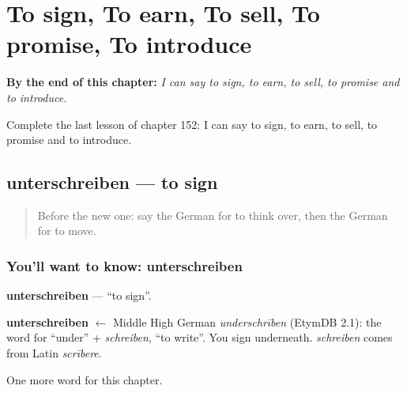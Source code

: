 
\chapter{To sign, To earn, To sell, To promise, To introduce}
\label{ch:ge-to-sign-to-earn-to-sell-to-promise-to-introduce}

\begin{chapteropening}
\textbf{By the end of this chapter:} \emph{I can say to sign, to earn, to sell, to promise and to introduce.}

Complete the last lesson of chapter 152: I can say to sign, to earn, to sell, to promise and to introduce.
\end{chapteropening}

\section[unterschreiben]{unterschreiben — to sign}

\label{lesson:GE-C152-unterschreiben}



\begin{quote}
Before the new one: say the German for to think over, then the German for to move.
\end{quote}

\subsection*{You'll want to know: unterschreiben}
\textbf{unterschreiben} — \textquotedblleft{}to sign\textquotedblright{}.

\begin{cousinweb}
\textbf{unterschreiben} $\leftarrow$ Middle High German \emph{underschrīben} (EtymDB 2.1): the word for \textquotedblleft{}under\textquotedblright{} + \emph{schreiben}, \textquotedblleft{}to write\textquotedblright{}. You sign underneath. \emph{schreiben} comes from Latin \emph{scrībere}.
\end{cousinweb}

\begin{grammarlens}[title={What you've built}]
One more word for this chapter.
\end{grammarlens}

